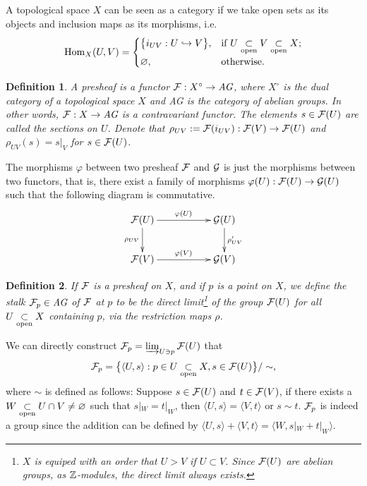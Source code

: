 \documentclass[8pt]{article}
\theoremstyle{plain}
\newtheorem{defi}{Definition}
\begin{document}
A topological space $X$ can be seen as a category if we take open sets as its objects and inclusion maps as its morphisms, i.e. 
\[
	\operatorname{Hom}_{X}(U,V)=\begin{cases}
	\bigl\{i_{UV}:U\hookrightarrow V\bigr\},& \text{if }U\underset{\mathrm{open}}{\subset} V\underset{\mathrm{open}}{\subset} X\text{;}\\
	\varnothing,&\text{otherwise}.
	\end{cases}
\]

\begin{defi}
	A presheaf is a functor $\mathcal{F}:X^\circ\to \textit{AG}$, where $X^\circ$ is the dual category of a topological space $X$ and \textit{AG} is the category of abelian groups. In other words, $\mathcal{F}:X\to \textit{AG}$ is a contravariant functor. The elements $s\in \mathcal{F}(U)$ are called the sections on $U$. Denote that $\rho_{UV}:=\mathcal{F}(i_{UV}):\mathcal{F}(V)\to\mathcal{F}(U)$ and $\rho_{UV}(s)=s|_V$ for $s \in \mathcal{F}(U)$.
\end{defi}

The morphisms $\varphi$ between two presheaf $\mathcal{F}$ and $\mathcal{G}$ is just the morphisms between two functors, that is, there exist a family of morphisms $\varphi(U):\mathcal{F}(U)\to \mathcal{G}(U)$ such that the following diagram is commutative.
\[
	\begin{xy}
	\xymatrix{
		\calf(U)\ar[rr]^{\varphi(U)} \ar[d]_{\rho_{UV}}&&\calg(U) \ar[d]^{\rho'_{UV}}\\
		\calf(V)\ar[rr]^{\varphi(V)}&&\calg(V)
	}
	\end{xy}
\]
\begin{defi}
	If $\mathcal{F}$ is a presheaf on $X$, and if $p$ is a point on $X$, we define the stalk $\mathcal{F}_p\in \textit{AG}$ of $\mathcal{F}$ at $p$ to be the direct limit\footnote{$X$ is equiped with an order that $U>V$ if $U\subset V$. Since $\mathcal{F}(U)$ are abelian groups, as $\mathbb{Z}$-modules, the direct limit always exists.} of the group $\mathcal{F}(U)$ for all $U \underset{\mathrm{open}}{\subset} X$ containing $p$, via the restriction maps $\rho$.
\end{defi}

We can directly construct $\mathcal{F}_p=\varinjlim_{U\ni p}\mathcal{F}(U)$ that 
\[
	\mathcal{F}_p=\bigl\{\langle U,s\rangle: p\in U\underset{\mathrm{open}}{\subset} X, s\in \mathcal{F}(U)\bigr\}/\sim,
\]
where $\sim$ is defined as follows: Suppose $s\in\mathcal{F}(U)$ and $t\in\mathcal{F}(V)$, if there exists a $W\underset{\mathrm{open}}{\subset} U\cap V\neq \varnothing$ such that $s|_W=t|_W$, then $\langle U,s\rangle=\langle V,t\rangle$ or $s\sim t$. $\mathcal{F}_p$ is indeed a group since the addition can be defined by $\langle U,s\rangle+\langle V,t\rangle=\langle W,s|_W+t|_W\rangle$. 
\end{document}
